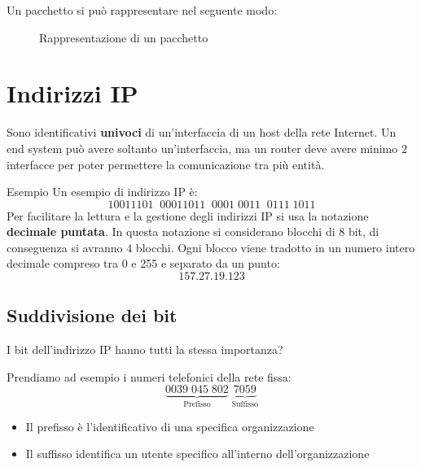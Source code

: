 \documentclass[a4paper]{article}
\begin{document}
\noindent
Un pacchetto si può rappresentare nel seguente modo:
\begin{figure}[H]
  \centering
  \caption{Rappresentazione di un pacchetto}
\end{figure}

\pagebreak

\section{Indirizzi IP}
Sono identificativi \textbf{univoci} di un'interfaccia di un host della rete Internet.
Un end system può avere soltanto un'interfaccia, ma un router deve avere minimo 2
interfacce per poter permettere la comunicazione tra più entità.


\begin{examplebox}{Esempio}
  Un esempio di indirizzo IP è:
  \[
    10011101 \;\; 00011011 \;\; 0001 \; 0011 \;\; 0111 \; 1011
  \] 
  Per facilitare la lettura e la gestione degli indirizzi IP si usa la notazione
  \textbf{decimale puntata}. In questa notazione si considerano blocchi di 8 bit, di
  conseguenza si avranno 4 blocchi. Ogni blocco viene tradotto in un numero intero decimale
  compreso tra 0 e 255 e separato da un punto:
  \[
    157.27.19.123
  \] 
\end{examplebox}

\subsection{Suddivisione dei bit}
I bit dell'indirizzo IP hanno tutti la stessa importanza?

\vspace{1em}
\noindent
Prendiamo ad esempio i numeri telefonici della rete fissa:
\[
  \underbrace{0039 \; 045 \; 802}_{\text{Prefisso}} \; \underbrace{7059}_{\text{Suffisso}}
\] 
\begin{itemize}
  \item Il prefisso è l'identificativo di una specifica organizzazione
  \item Il suffisso identifica un utente specifico all'interno dell'organizzazione
\end{itemize}
\end{document}
